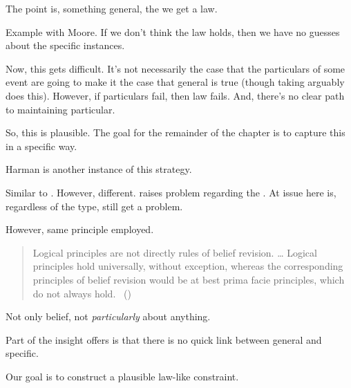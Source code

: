 \begin{note}
  The point is, something general, the we get a law.
\end{note}

\begin{note}
  Example with Moore.
  If we don't think the law holds, then we have no guesses about the specific instances.

  Now, this gets difficult.
  It's not necessarily the case that the particulars of some event are going to make it the case that general is true (though taking arguably does this).
  However, if particulars fail, then law fails.
  And, there's no clear path to maintaining particular.
\end{note}

\begin{note}
  So, this is plausible.
  The goal for the remainder of the chapter is to capture this in a specific way.
\end{note}

\begin{note}
  {
    \color{red}
    Harman is another instance of this strategy.
  }

  Similar to \citeauthor{Harman:1984aa,Harman:1986ux}.
  However, different.
  \citeauthor{Harman:1986ux} raises problem regarding the \tor{}.
  At issue here is, regardless of the type, still get a problem.

  However, same principle employed.

  \begin{quote}
    Logical principles are not directly rules of belief revision.
    \dots
    Logical principles hold universally, without exception, whereas the corresponding principles of belief revision would be at best prima facie principles, which do not always hold.%
    \mbox{ }\hfill\mbox{(\citeyear[107--108]{Harman:1984aa})}
  \end{quote}
  Not only belief, not \emph{particularly} about anything.

  Part of the insight \citeauthor{Harman:1986ux} offers is that there is no quick link between general and specific.
\end{note}


\newpage

\begin{note}
  Our goal is to construct a plausible law-like constraint.
\end{note}

\section{}
\label{cha:typical:sec:tR}

